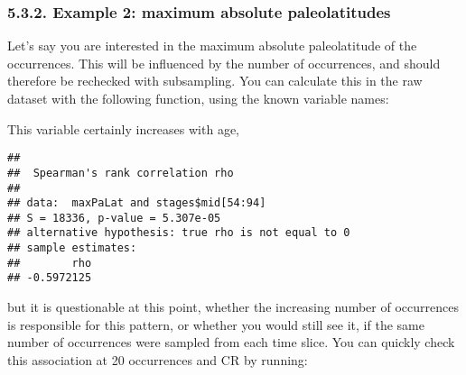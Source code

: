 \documentclass[]{article}
\newenvironment{Shaded}{\begin{snugshade}}{\end{snugshade}}
\newcommand{\KeywordTok}[1]{\textcolor[rgb]{0.13,0.29,0.53}{\textbf{{#1}}}}
\newcommand{\DataTypeTok}[1]{\textcolor[rgb]{0.13,0.29,0.53}{{#1}}}
\newcommand{\DecValTok}[1]{\textcolor[rgb]{0.00,0.00,0.81}{{#1}}}
\newcommand{\StringTok}[1]{\textcolor[rgb]{0.31,0.60,0.02}{{#1}}}
\newcommand{\NormalTok}[1]{{#1}}
\begin{document}
\subsubsection{5.3.2. Example 2: maximum absolute
paleolatitudes}\label{example-2-maximum-absolute-paleolatitudes}

Let's say you are interested in the maximum absolute paleolatitude of
the occurrences. This will be influenced by the number of occurrences,
and should therefore be rechecked with subsampling. You can calculate
this in the raw dataset with the following function, using the known
variable names:

\begin{Shaded}
\end{Shaded}

This variable certainly increases with age,

\begin{Shaded}
\end{Shaded}

\begin{verbatim}
## 
##  Spearman's rank correlation rho
## 
## data:  maxPaLat and stages$mid[54:94]
## S = 18336, p-value = 5.307e-05
## alternative hypothesis: true rho is not equal to 0
## sample estimates:
##        rho 
## -0.5972125
\end{verbatim}

but it is questionable at this point, whether the increasing number of
occurrences is responsible for this pattern, or whether you would still
see it, if the same number of occurrences were sampled from each time
slice. You can quickly check this association at 20 occurrences and CR
by running:
\end{document}
